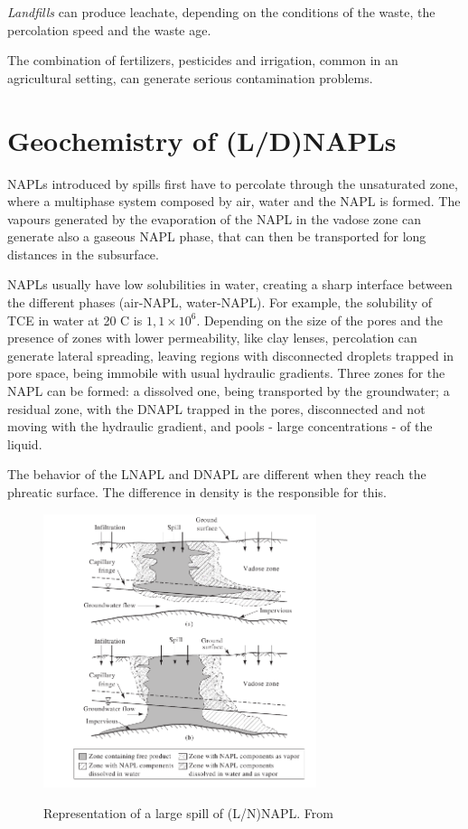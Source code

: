 \documentclass[11pt,twoside]{report}
\begin{document}
\textit{Landfills} can produce leachate, depending on the conditions of the waste, the percolation speed and the waste age. 

The combination of fertilizers, pesticides and irrigation, common in an agricultural setting, can generate serious contamination problems. 

\section{Geochemistry of (L/D)NAPLs}
NAPLs introduced by spills first have to percolate through the unsaturated zone, where a multiphase system composed by air, water and the NAPL is formed. The vapours generated by the evaporation of the NAPL in the vadose zone can generate also a gaseous NAPL phase, that can then be transported for long distances in the subsurface. 

NAPLs usually have low solubilities in water, creating a sharp interface between the different phases (air-NAPL, water-NAPL). For example, the solubility of TCE in water at 20 C is $1,1 \times 10^{6}$. Depending on the size of the pores and the presence of zones with lower permeability, like clay lenses, percolation can generate lateral spreading, leaving regions with disconnected droplets trapped in pore space, being immobile with usual hydraulic gradients. Three zones for the NAPL can be formed: a dissolved one, being transported by the groundwater; a residual zone, with the DNAPL trapped in the pores, disconnected and not moving with the hydraulic gradient, and pools - large concentrations - of the liquid. 


The behavior of the LNAPL and DNAPL are different when they reach the phreatic surface. The difference in density is the responsible for this.

\begin{figure}
   \centering
   \includegraphics[width=8cm]{./img/bear-ldnapl.png}
   \label{ldnapl}
   \caption{Representation of a large spill of (L/N)NAPL. From \cite{bearcontaminant}}
\end{figure}
\end{document}

